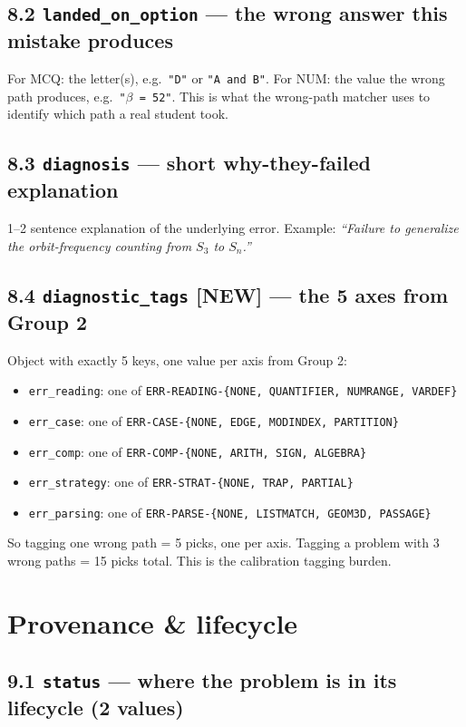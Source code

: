 \documentclass[11pt,letterpaper]{article}
\newcommand{\cd}[1]{\texttt{\small #1}}
\newcommand{\NEW}{\textcolor{accent}{\textbf{[NEW]}}}
\begin{document}
\subsection*{8.2 \cd{landed\_on\_option} --- the wrong answer this mistake produces}

For MCQ: the letter(s), e.g.\ \cd{"D"} or \cd{"A and B"}. For NUM: the value the wrong path produces, e.g.\ \cd{"$\beta$ = 52"}. This is what the wrong-path matcher uses to identify which path a real student took.

\subsection*{8.3 \cd{diagnosis} --- short why-they-failed explanation}

1--2 sentence explanation of the underlying error. Example: \emph{``Failure to generalize the orbit-frequency counting from $S_3$ to $S_n$.''}

\subsection*{8.4 \cd{diagnostic\_tags} \NEW{} --- the 5 axes from Group 2}

Object with exactly 5 keys, one value per axis from Group 2:
\begin{itemize}\itemsep0em
\item \cd{err\_reading}: one of \cd{ERR-READING-\{NONE, QUANTIFIER, NUMRANGE, VARDEF\}}
\item \cd{err\_case}: one of \cd{ERR-CASE-\{NONE, EDGE, MODINDEX, PARTITION\}}
\item \cd{err\_comp}: one of \cd{ERR-COMP-\{NONE, ARITH, SIGN, ALGEBRA\}}
\item \cd{err\_strategy}: one of \cd{ERR-STRAT-\{NONE, TRAP, PARTIAL\}}
\item \cd{err\_parsing}: one of \cd{ERR-PARSE-\{NONE, LISTMATCH, GEOM3D, PASSAGE\}}
\end{itemize}

So tagging one wrong path = 5 picks, one per axis. Tagging a problem with 3 wrong paths = 15 picks total. This is the calibration tagging burden.

\section{Provenance \& lifecycle}\label{sec:prov}

\subsection*{9.1 \cd{status} --- where the problem is in its lifecycle (2 values)}
\end{document}
